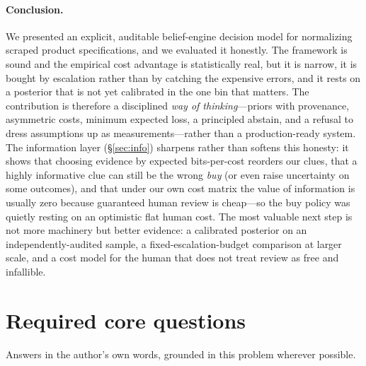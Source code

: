 \documentclass[11pt]{article}
\begin{document}
\paragraph{Conclusion.} We presented an explicit, auditable belief-engine decision model
for normalizing scraped product specifications, and we evaluated it honestly. The
framework is sound and the empirical cost advantage is statistically real, but it is
narrow, it is bought by escalation rather than by catching the expensive errors, and it
rests on a posterior that is not yet calibrated in the one bin that matters. The
contribution is therefore a disciplined \emph{way of thinking}---priors with provenance,
asymmetric costs, minimum expected loss, a principled abstain, and a refusal to dress
assumptions up as measurements---rather than a production-ready system. The information
layer (\S\ref{sec:info}) sharpens rather than softens this honesty: it shows that
choosing evidence by expected bits-per-cost reorders our clues, that a highly
informative clue can still be the wrong \emph{buy} (or even raise uncertainty on some
outcomes), and that under our own cost matrix the value of information is usually zero
because guaranteed human review is cheap---so the buy policy was quietly resting on an
optimistic flat human cost. The most valuable next step is not more machinery but
better evidence: a calibrated posterior on an independently-audited sample, a
fixed-escalation-budget comparison at larger scale, and a cost model for the human that
does not treat review as free and infallible.

\appendix
\section{Required core questions}
\label{app:core}
Answers in the author's own words, grounded in this problem wherever possible.
\end{document}
